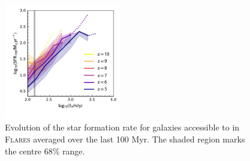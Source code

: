 \begin{figure}
	\centering
	\includegraphics[width=0.45\textwidth]{figures/physical/zevo_SFR_SFR_100.pdf}
	\caption{Evolution of the star formation rate for galaxies accessible to \euclid \: in \textsc{Flares} averaged over the last 100 Myr. The shaded region marks the centre 68\% range.}
	\label{fig:physical:sfr_zevo_100}
\end{figure}
